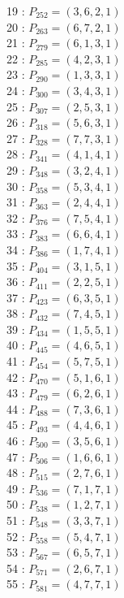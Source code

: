 \documentclass{article}
\begin{document}
{\begin{multicols}{2}
19 : $P_{252}=( 3, 6, 2, 1 )$\\
20 : $P_{263}=( 6, 7, 2, 1 )$\\
21 : $P_{279}=( 6, 1, 3, 1 )$\\
22 : $P_{285}=( 4, 2, 3, 1 )$\\
23 : $P_{290}=( 1, 3, 3, 1 )$\\
24 : $P_{300}=( 3, 4, 3, 1 )$\\
25 : $P_{307}=( 2, 5, 3, 1 )$\\
26 : $P_{318}=( 5, 6, 3, 1 )$\\
27 : $P_{328}=( 7, 7, 3, 1 )$\\
28 : $P_{341}=( 4, 1, 4, 1 )$\\
29 : $P_{348}=( 3, 2, 4, 1 )$\\
30 : $P_{358}=( 5, 3, 4, 1 )$\\
31 : $P_{363}=( 2, 4, 4, 1 )$\\
32 : $P_{376}=( 7, 5, 4, 1 )$\\
33 : $P_{383}=( 6, 6, 4, 1 )$\\
34 : $P_{386}=( 1, 7, 4, 1 )$\\
35 : $P_{404}=( 3, 1, 5, 1 )$\\
36 : $P_{411}=( 2, 2, 5, 1 )$\\
37 : $P_{423}=( 6, 3, 5, 1 )$\\
38 : $P_{432}=( 7, 4, 5, 1 )$\\
39 : $P_{434}=( 1, 5, 5, 1 )$\\
40 : $P_{445}=( 4, 6, 5, 1 )$\\
41 : $P_{454}=( 5, 7, 5, 1 )$\\
42 : $P_{470}=( 5, 1, 6, 1 )$\\
43 : $P_{479}=( 6, 2, 6, 1 )$\\
44 : $P_{488}=( 7, 3, 6, 1 )$\\
45 : $P_{493}=( 4, 4, 6, 1 )$\\
46 : $P_{500}=( 3, 5, 6, 1 )$\\
47 : $P_{506}=( 1, 6, 6, 1 )$\\
48 : $P_{515}=( 2, 7, 6, 1 )$\\
49 : $P_{536}=( 7, 1, 7, 1 )$\\
50 : $P_{538}=( 1, 2, 7, 1 )$\\
51 : $P_{548}=( 3, 3, 7, 1 )$\\
52 : $P_{558}=( 5, 4, 7, 1 )$\\
53 : $P_{567}=( 6, 5, 7, 1 )$\\
54 : $P_{571}=( 2, 6, 7, 1 )$\\
55 : $P_{581}=( 4, 7, 7, 1 )$\\
\end{multicols}
}
\end{document}
